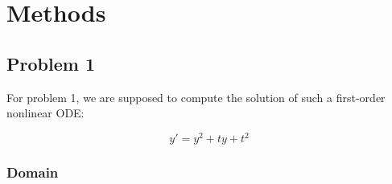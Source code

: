\documentclass[a4paper]{article}
\begin{document}
	
	

	
	
	
	
	
	\section{Methods}
	
	\subsection{Problem 1}
	
	For problem 1, we are supposed to compute the solution of such a first-order nonlinear ODE: 
	
	\begin{equation} \label{eq:ode1}
	    y' = y^2 + ty + t^2 \tag{ODE1}
	\end{equation}
	
	\subsubsection{Domain}
	
\end{document}
